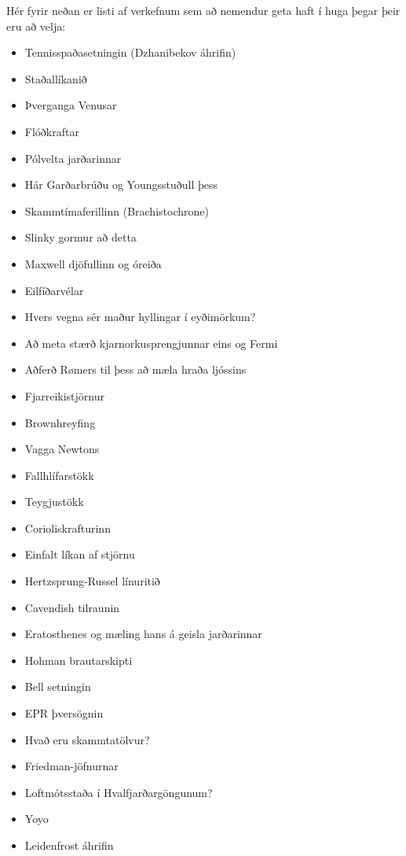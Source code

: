 Hér fyrir neðan er listi af verkefnum sem að nemendur geta haft í huga þegar þeir eru að velja:

\begin{multicols}{3}

\begin{itemize}
    \item Tennisspaðasetningin (Dzhanibekov áhrifin)
    \item Staðallíkanið
    \item Þverganga Venusar
    \item Flóðkraftar
    \item Pólvelta jarðarinnar
    \item Hár Garðarbrúðu og Youngsstuðull þess
    \item Skammtímaferillinn (Brachistochrone)
    \item Slinky gormur að detta
    \item Maxwell djöfullinn og óreiða
    \item Eilfíðarvélar
    \item Hvers vegna sér maður hyllingar í eyðimörkum?
    \item Að meta stærð kjarnorkusprengjunnar eins og Fermi
    \item Aðferð Rømers til þess að mæla hraða ljóssins
    \item Fjarreikistjörnur
    \item Brownhreyfing
    \item Vagga Newtons
    \item Fallhlífarstökk
    \item Teygjustökk
    \item Corioliskrafturinn
    \item Einfalt líkan af stjörnu
    \item Hertzsprung-Russel línuritið
    \item Cavendish tilraunin
    \item Eratosthenes og mæling hans á geisla jarðarinnar
    \item Hohman brautarskipti
    \item Bell setningin
    \item EPR þversögnin
    \item Hvað eru skammtatölvur?
    \item Friedman-jöfnurnar
    \item Loftmótsstaða í Hvalfjarðargöngunum?
    \item Yoyo
    \item Leidenfrost áhrifin

\end{itemize}
\end{multicols}
